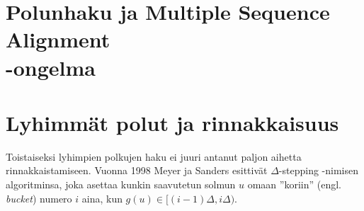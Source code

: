 \documentclass[finnish]{tktltiki2}
\theoremstyle{definition}
\theoremstyle{remark}
\begin{document}
\section{Polunhaku ja Multiple Sequence Alignment \\-ongelma}

\section{Lyhimmät polut ja rinnakkaisuus}
Toistaiseksi lyhimpien polkujen haku ei juuri antanut paljon aihetta rinnakkaistamiseen. Vuonna 1998 Meyer ja Sanders esittivät $\Delta$-stepping -nimisen algoritminsa, joka asettaa kunkin saavutetun solmun $u$ omaan ''koriin'' (engl. \textit{bucket}) numero $i$ aina, kun $g(u) \in [(i - 1)\Delta, i\Delta)$.






% 
\end{document}
